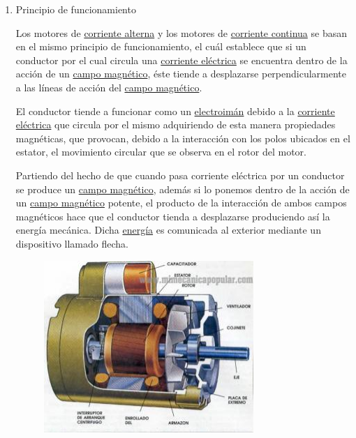 \documentclass[12pt]{article}
\begin{document}
\begin{enumerate}
	\item  Principio de funcionamiento\par

Los motores de \href{http://es.wikipedia.org/wiki/Corriente_alterna}{corriente alterna} y los motores de \href{http://es.wikipedia.org/wiki/Corriente_continua}{corriente continua} se basan en el mismo principio de funcionamiento, el cuál establece que si un conductor por el cual circula una \href{http://es.wikipedia.org/wiki/Corriente_eléctrica}{corriente eléctrica} se encuentra dentro de la acción de un \href{http://es.wikipedia.org/wiki/Campo_magnético}{campo magnético}, éste tiende a desplazarse perpendicularmente a las líneas de acción del \href{http://es.wikipedia.org/wiki/Campo_magnético}{campo magnético}.\par

El conductor tiende a funcionar como un \href{http://es.wikipedia.org/wiki/Electroimán}{electroimán} debido a la \href{http://es.wikipedia.org/wiki/Corriente_eléctrica}{corriente eléctrica} que circula por el mismo adquiriendo de esta manera propiedades magnéticas, que provocan, debido a la interacción con los polos ubicados en el estator, el movimiento circular que se observa en el rotor del motor.\par

Partiendo del hecho de que cuando pasa corriente eléctrica por un conductor se produce un \href{http://es.wikipedia.org/wiki/Campo_magnético}{campo magnético}, además si lo ponemos dentro de la acción de un \href{http://es.wikipedia.org/wiki/Campo_magnético}{campo magnético} potente, el producto de la interacción de ambos campos magnéticos hace que el conductor tienda a desplazarse produciendo así la energía mecánica. Dicha \href{http://es.wikipedia.org/wiki/Energía}{energía} es comunicada al exterior mediante un dispositivo llamado flecha.\par




\begin{figure}[H]
	\begin{Center}
		\includegraphics[width=3.13in,height=2.57in]{./media/image2.jpeg}
	\end{Center}
\end{figure}



\end{enumerate}
\end{document}
